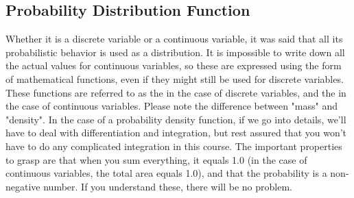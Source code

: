 \documentclass{ltjbook}
\begin{document}
\subsection{Probability Distribution Function}
Whether it is a discrete variable or a continuous variable, it was said that all its probabilistic behavior is used as a distribution. It is impossible to write down all the actual values for continuous variables, so these are expressed using the form of mathematical functions, even if they might still be used for discrete variables.
These functions are referred to as the  in the case of discrete variables, and the  in the case of continuous variables. Please note the difference between "mass" and "density". In the case of a probability density function, if we go into details, we'll have to deal with differentiation and integration, but rest assured that you won't have to do any complicated integration in this course.  The important properties to grasp are that when you sum everything, it equals 1.0 (in the case of continuous variables, the total area equals 1.0), and that the probability is a non-negative number. If you understand these, there will be no problem.
\end{document}
